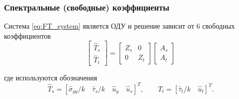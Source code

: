 \begin{frame}
    \frametitle{Спектральные (свободные) коэффициенты}
    Система \eqref{eq:FT_system} является ОДУ и решение зависит от 6 свободных коэффициентов
    \begin{equation}
        \label{eq:fourier_solution}
        \left[
        \begin{array}{c}
            \hat{T}_s \\
            \hat{T}_t 
        \end{array}
        \right]
        =
        \left[
        \begin{array}{cc}
            Z_s & 0 \\
            0 & Z_t 
        \end{array}
        \right]
        \left[
        \begin{array}{c}
            A_s \\
            A_t 
        \end{array}
        \right]
    \end{equation}
    
    где используются обозначения
    \begin{equation}
        \label{eq:FourierSeparateT}
        \hat{T}_s = \left[\hat{\sigma}_{yy}/k \quad \hat{\tau}_s/k \quad \hat{u}_y \quad \hat{u}_s \right]^T, \qquad 
        \hat{T}_t = \left[ \hat{\tau}_t/k \quad  \hat{u}_t \right]^T.
    \end{equation}
\end{frame}

